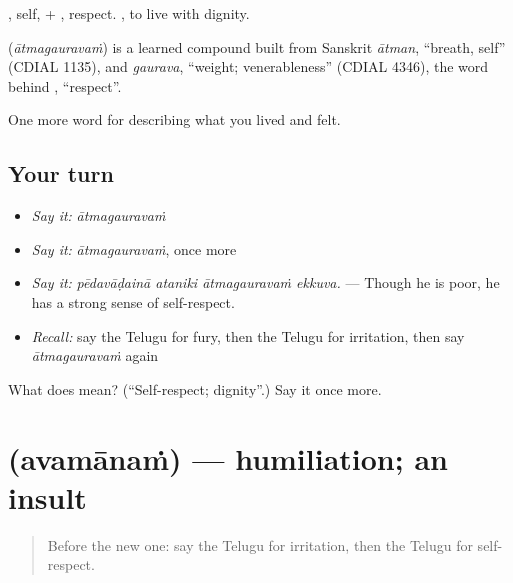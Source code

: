 , self, + , respect.  , to live with dignity.

\begin{cousinweb}
\textbf{} (\emph{ātmagauravaṁ}) is a learned compound built from Sanskrit \emph{ātman}, \textquotedblleft{}breath, self\textquotedblright{} (CDIAL 1135), and \emph{gaurava}, \textquotedblleft{}weight; venerableness\textquotedblright{} (CDIAL 4346), the word behind , \textquotedblleft{}respect\textquotedblright{}.
\end{cousinweb}

\begin{grammarlens}[title={What you've built}]
One more word for describing what you lived and felt.
\end{grammarlens}

\subsection*{Your turn}
\begin{itemize}
\raggedright
  \item \emph{Say it:} \emph{ātmagauravaṁ}
  \item \emph{Say it:} \emph{ātmagauravaṁ}, once more
  \item \emph{Say it:} \emph{pēdavāḍainā ataniki ātmagauravaṁ ekkuva.} — Though he is poor, he has a strong sense of self-respect.
  \item \emph{Recall:} say the Telugu for fury, then the Telugu for irritation, then say \emph{ātmagauravaṁ} again
\end{itemize}

\begin{tcolorbox}[breakable,colback=teal!4,colframe=teal!35!black,title={Before you move on}]
What does  mean? (\textquotedblleft{}Self-respect; dignity\textquotedblright{}.) Say it once more.
\end{tcolorbox}
\section[\texorpdfstring{\te{అవమానం} (avamānaṁ)}{అవమానం (avamānaṁ)}]{ (avamānaṁ) — humiliation; an insult}

\label{lesson:TE-C498-avamanam}



\begin{quote}
Before the new one: say the Telugu for irritation, then the Telugu for self-respect.
\end{quote}

